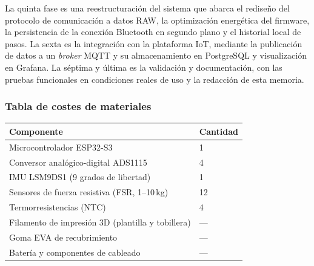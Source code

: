 \begin{IAtext}
La quinta fase es una reestructuración del sistema que abarca el rediseño del protocolo de comunicación a datos RAW, la optimización energética del firmware, la persistencia de la conexión Bluetooth en segundo plano y el historial local de pasos. La sexta es la integración con la plataforma IoT, mediante la publicación de datos a un \textit{broker} MQTT y su almacenamiento en PostgreSQL y visualización en Grafana. La séptima y última es la validación y documentación, con las pruebas funcionales en condiciones reales de uso y la redacción de esta memoria.

\subsubsection*{Tabla de costes de materiales}
\begin{center}
\begin{tabular}{|l|l|}
\hline
\textbf{Componente} & \textbf{Cantidad} \\
\hline
Microcontrolador ESP32-S3 & 1 \\
Conversor analógico-digital ADS1115 & 4 \\
IMU LSM9DS1 (9 grados de libertad) & 1 \\
Sensores de fuerza resistiva (FSR, 1--10\,kg) & 12 \\
Termorresistencias (NTC) & 4 \\
Filamento de impresión 3D (plantilla y tobillera) & --- \\
Goma EVA de recubrimiento & --- \\
Batería y componentes de cableado & --- \\
\hline
\end{tabular}
\end{center}

\end{IAtext}